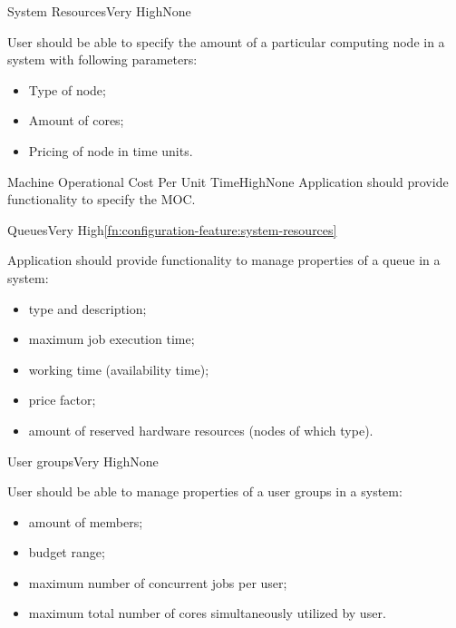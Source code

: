 	\begin{functional}{System Resources}{Very High}{None}
		\label{fn:configuration-feature:system-resources}
		{
			User should be able to specify the amount of a particular \gls{computing node} in a system with following parameters:
			\begin{itemize}
				\item Type of node;
				\item Amount of cores;
				\item Pricing of node in time units.
			\end{itemize}
		}
	\end{functional}

	\begin{functional}{Machine Operational Cost Per Unit Time}{High}{None}
		\label{fn:configuration-feature:machine-opertional-cost-per-unit-time}
		{
			Application should provide functionality to specify the \gls{MOC}. 
		}
	\end{functional}

	\begin{functional}{Queues}{Very High}{\ref{fn:configuration-feature:system-resources}}
		\label{fn:configuration-feature:queues}
		{
			Application should provide functionality to manage properties of a queue in a system:
			\begin{itemize}
				\item type and description;
				\item maximum job execution time;
				\item working time (availability time);
				\item price factor;
				\item amount of reserved hardware resources (nodes of which type).
			\end{itemize} 
		}
	\end{functional}

	\begin{functional}{User groups}{Very High}{None}
		\label{fn:configuration-feature:user-groups}
		{
			User should be able to manage properties of a user groups in a system:
			\begin{itemize}
				\item amount of members;
				\item budget range;
				\item maximum number of concurrent jobs per user;
				\item maximum total number of cores simultaneously utilized by user.
			\end{itemize} 
		}
	\end{functional}


